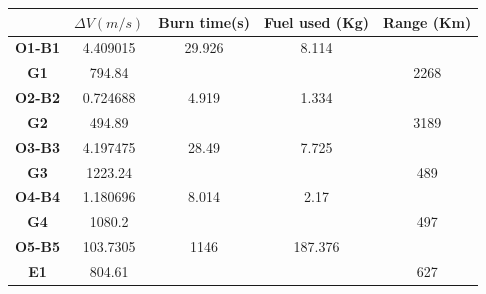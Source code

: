\begin{table}[htb!]
  \centering
    \begin{tabular}{|r|r|r|r|r|}
    \hline
          & \boldmath{}\textbf{$\Delta V (m/s)$}\unboldmath{} & \textbf{Burn time(s)} & \textbf{Fuel used (Kg)} & \textbf{Range (Km)} \bigstrut\\
    \hline
    \multicolumn{1}{|c|}{\textbf{O1-B1}} & \multicolumn{1}{c|}{4.409015} & \multicolumn{1}{c|}{29.926} & \multicolumn{1}{c|}{8.114} & \multicolumn{1}{c|}{} \bigstrut\\
    \hline
    \multicolumn{1}{|c|}{\textbf{G1}} & \multicolumn{1}{c|}{794.84} & \multicolumn{1}{c|}{} & \multicolumn{1}{c|}{} & \multicolumn{1}{c|}{2268} \bigstrut\\
    \hline
    \multicolumn{1}{|c|}{\textbf{O2-B2}} & \multicolumn{1}{c|}{0.724688} & \multicolumn{1}{c|}{4.919} & \multicolumn{1}{c|}{1.334} & \multicolumn{1}{c|}{} \bigstrut\\
    \hline
    \multicolumn{1}{|c|}{\textbf{G2}} & \multicolumn{1}{c|}{494.89} & \multicolumn{1}{c|}{} & \multicolumn{1}{c|}{} & \multicolumn{1}{c|}{3189} \bigstrut\\
    \hline
    \multicolumn{1}{|c|}{\textbf{O3-B3}} & \multicolumn{1}{c|}{4.197475} & \multicolumn{1}{c|}{28.49} & \multicolumn{1}{c|}{7.725} & \multicolumn{1}{c|}{} \bigstrut\\
    \hline
    \multicolumn{1}{|c|}{\textbf{G3}} & \multicolumn{1}{c|}{1223.24} & \multicolumn{1}{c|}{} & \multicolumn{1}{c|}{} & \multicolumn{1}{c|}{489} \bigstrut\\
    \hline
    \multicolumn{1}{|c|}{\textbf{O4-B4}} & \multicolumn{1}{c|}{1.180696} & \multicolumn{1}{c|}{8.014} & \multicolumn{1}{c|}{2.17} & \multicolumn{1}{c|}{} \bigstrut\\
    \hline
    \multicolumn{1}{|c|}{\textbf{G4}} & \multicolumn{1}{c|}{1080.2} & \multicolumn{1}{c|}{} & \multicolumn{1}{c|}{} & \multicolumn{1}{c|}{497} \bigstrut\\
    \hline
    \multicolumn{1}{|c|}{\textbf{O5-B5}} & \multicolumn{1}{c|}{103.7305} & \multicolumn{1}{c|}{1146} & \multicolumn{1}{c|}{187.376} & \multicolumn{1}{c|}{} \bigstrut\\
    \hline
    \multicolumn{1}{|c|}{\textbf{E1}} & \multicolumn{1}{c|}{804.61} & \multicolumn{1}{c|}{} & \multicolumn{1}{c|}{} & \multicolumn{1}{c|}{627} \bigstrut\\

\end{tabular}
\end{table}
